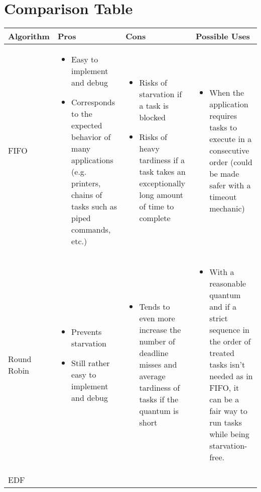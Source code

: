 \documentclass[./report.tex]{subfiles}
\begin{document}
\newpage
\section{Comparison Table}

\begin{tabular}{|m{8em}|m{12em}|m{12em}|m{12em}|} 
	\hline 
	\textbf{Algorithm} & \textbf{Pros} & \textbf{Cons} & \textbf{Possible Uses} \\ 
	\hline
	FIFO 
	&  
	\begin{itemize}[leftmargin=*]
		\item Easy to implement and debug
		\item Corresponds to the expected behavior of many applications (e.g. printers, chains of tasks such as piped commands, etc.)
	\end{itemize}
	&  
	\begin{itemize}[leftmargin=*]
		\item Risks of starvation if a task is blocked
		\item Risks of heavy tardiness if a task takes an exceptionally long amount of time to complete
	\end{itemize}
	& 
	\begin{itemize}[leftmargin=*]
		\item When the application requires tasks to execute in a consecutive order (could be made safer with a timeout mechanic)
	\end{itemize}
	\\
	\hline
	Round Robin 
	&  
	\begin{itemize}[leftmargin=*]
		\item Prevents starvation
		\item Still rather easy to implement and debug
	\end{itemize}
	&  
	\begin{itemize}[leftmargin=*]
		\item Tends to even more increase the number of deadline misses and average tardiness of tasks if the quantum is short
	\end{itemize}
	& 
	\begin{itemize}[leftmargin=*]
		\item With a reasonable quantum and if a strict sequence in the order of treated tasks isn't needed as in FIFO, it can be a fair way to run tasks while being starvation-free.
	\end{itemize}
	\\
	\hline
	EDF 
	&  
	\begin{itemize}[leftmargin=*]

\end{itemize}
\end{tabular}
\end{document}
